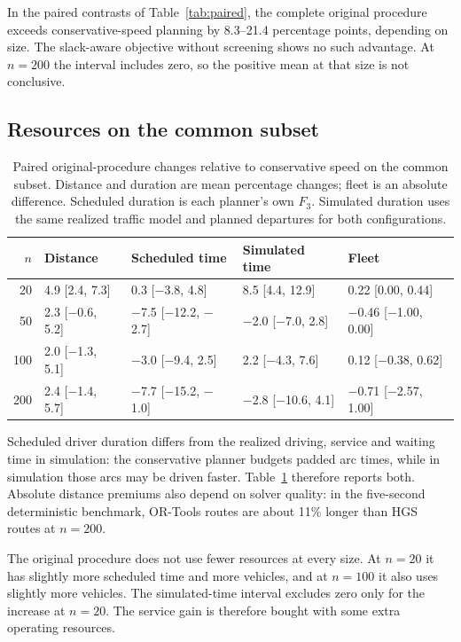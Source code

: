 In the paired contrasts of Table~\ref{tab:paired}, the complete original procedure exceeds conservative-speed planning by 8.3--21.4 percentage points, depending on size. The slack-aware objective without screening shows no such advantage. At $n=200$ the interval includes zero, so the positive mean at that size is not conclusive.

\subsection{Resources on the common subset}

\begin{table}[htbp]
\centering
\scriptsize
\caption{Paired original-procedure changes relative to conservative speed on the common subset. Distance and duration are mean percentage changes; fleet is an absolute difference. Scheduled duration is each planner's own $F_3$. Simulated duration uses the same realized traffic model and planned departures for both configurations.}
\label{tab:cost}
\begin{tabular}{rllll}
\toprule
$n$ & Distance & Scheduled time & Simulated time & Fleet\\
\midrule
20 & 4.9 [2.4, 7.3] & 0.3 [$-$3.8, 4.8] & 8.5 [4.4, 12.9] & 0.22 [0.00, 0.44]\\
50 & 2.3 [$-$0.6, 5.2] & $-$7.5 [$-$12.2, $-$2.7] & $-$2.0 [$-$7.0, 2.8] & $-$0.46 [$-$1.00, 0.00]\\
100 & 2.0 [$-$1.3, 5.1] & $-$3.0 [$-$9.4, 2.5] & 2.2 [$-$4.3, 7.6] & 0.12 [$-$0.38, 0.62]\\
200 & 2.4 [$-$1.4, 5.7] & $-$7.7 [$-$15.2, $-$1.0] & $-$2.8 [$-$10.6, 4.1] & $-$0.71 [$-$2.57, 1.00]\\
\bottomrule
\end{tabular}
\end{table}


Scheduled driver duration differs from the realized driving, service and waiting time in simulation: the conservative planner budgets padded arc times, while in simulation those arcs may be driven faster. Table~\ref{tab:cost} therefore reports both. Absolute distance premiums also depend on solver quality: in the five-second deterministic benchmark, OR-Tools routes are about 11\% longer than HGS routes at $n=200$.

The original procedure does not use fewer resources at every size. At $n=20$ it has slightly more scheduled time and more vehicles, and at $n=100$ it also uses slightly more vehicles. The simulated-time interval excludes zero only for the increase at $n=20$. The service gain is therefore bought with some extra operating resources.

